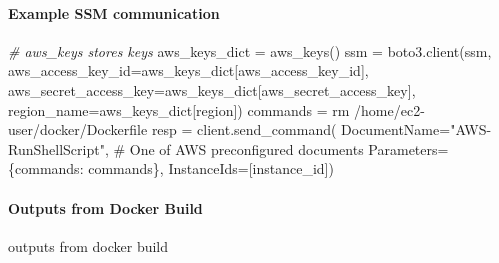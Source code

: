 \documentclass[
]{book}
\newenvironment{Shaded}{\begin{snugshade}}{\end{snugshade}}
\newcommand{\CommentTok}[1]{\textcolor[rgb]{0.56,0.35,0.01}{\textit{#1}}}
\newcommand{\ExtensionTok}[1]{#1}
\newcommand{\NormalTok}[1]{#1}
\newcommand{\StringTok}[1]{\textcolor[rgb]{0.31,0.60,0.02}{#1}}
\newcommand{\VariableTok}[1]{\textcolor[rgb]{0.00,0.00,0.00}{#1}}
\begin{document}
\hypertarget{example-ssm-communication}{%
\paragraph{Example SSM communication}\label{example-ssm-communication}}

\begin{Shaded}
\begin{Highlighting}[]
\CommentTok{\# aws\_keys stores keys}
\ExtensionTok{aws\_keys\_dict}\NormalTok{ = aws\_keys()}
\ExtensionTok{ssm}\NormalTok{ = boto3.client(}\StringTok{\textquotesingle{}ssm\textquotesingle{}}\NormalTok{,}
                   \VariableTok{aws\_access\_key\_id=}\NormalTok{aws\_keys\_dict[}\StringTok{\textquotesingle{}aws\_access\_key\_id\textquotesingle{}}\NormalTok{],}
                   \VariableTok{aws\_secret\_access\_key=}\NormalTok{aws\_keys\_dict[}\StringTok{\textquotesingle{}aws\_secret\_access\_key\textquotesingle{}}\NormalTok{],}
                   \VariableTok{region\_name=}\NormalTok{aws\_keys\_dict[}\StringTok{\textquotesingle{}region\textquotesingle{}}\NormalTok{])}
\ExtensionTok{commands}\NormalTok{ = }\StringTok{\textquotesingle{}rm /home/ec2{-}user/docker/Dockerfile\textquotesingle{}}
\ExtensionTok{resp}\NormalTok{ = client.send\_command(}
        \VariableTok{DocumentName=}\StringTok{"AWS{-}RunShellScript"}\NormalTok{, \# }\ExtensionTok{One}\NormalTok{ of AWS}\StringTok{\textquotesingle{} preconfigured documents}
\StringTok{        Parameters=\{\textquotesingle{}}\NormalTok{commands}\StringTok{\textquotesingle{}: commands\},}
\StringTok{        InstanceIds=[instance\_id])}
\end{Highlighting}
\end{Shaded}

\hypertarget{outputs-from-docker-build}{%
\paragraph{Outputs from Docker Build}\label{outputs-from-docker-build}}

outputs from docker build
\end{document}
